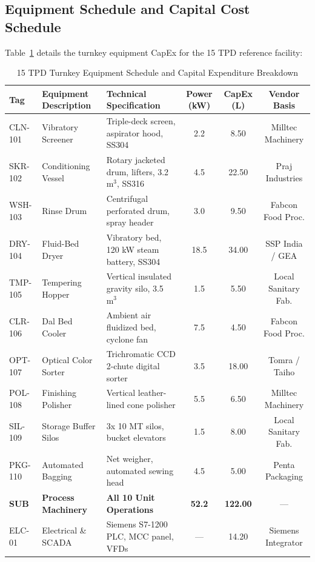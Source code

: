 \documentclass[10pt,a4paper]{article}
\newcommand{\inr}{\text{INR~}}
\begin{document}
\subsection{Equipment Schedule and Capital Cost Schedule}
Table~\ref{tab:equipment_schedule} details the turnkey equipment CapEx for the 15 TPD reference facility:

\begin{table}[H]
\centering
\small
\caption{15 TPD Turnkey Equipment Schedule and Capital Expenditure Breakdown}
\label{tab:equipment_schedule}
\begin{tabularx}{\linewidth}{lp{3.0cm}Xccc}
\toprule
\textbf{Tag} & \textbf{Equipment Description} & \textbf{Technical Specification} & \textbf{Power (kW)} & \textbf{CapEx (\inr L)} & \textbf{Vendor Basis} \\
\midrule
CLN-101 & Vibratory Screener & Triple-deck screen, aspirator hood, SS304 & 2.2 & 8.50 & Milltec Machinery \\
SKR-102 & Conditioning Vessel & Rotary jacketed drum, lifters, 3.2 $\text{m}^3$, SS316 & 4.5 & 22.50 & Praj Industries \\
WSH-103 & Rinse Drum & Centrifugal perforated drum, spray header & 3.0 & 9.50 & Fabcon Food Proc. \\
DRY-104 & Fluid-Bed Dryer & Vibratory bed, 120 kW steam battery, SS304 & 18.5 & 34.00 & SSP India / GEA \\
TMP-105 & Tempering Hopper & Vertical insulated gravity silo, 3.5 $\text{m}^3$ & 1.5 & 5.50 & Local Sanitary Fab. \\
CLR-106 & Dal Bed Cooler & Ambient air fluidized bed, cyclone fan & 7.5 & 4.50 & Fabcon Food Proc. \\
OPT-107 & Optical Color Sorter & Trichromatic CCD 2-chute digital sorter & 3.5 & 18.00 & Tomra / Taiho \\
POL-108 & Finishing Polisher & Vertical leather-lined cone polisher & 5.5 & 6.50 & Milltec Machinery \\
SIL-109 & Storage Buffer Silos & 3x 10 MT silos, bucket elevators & 1.5 & 8.00 & Local Sanitary Fab. \\
PKG-110 & Automated Bagging & Net weigher, automated sewing head & 4.5 & 5.00 & Penta Packaging \\
\midrule
\textbf{SUB} & \textbf{Process Machinery} & \textbf{All 10 Unit Operations} & \textbf{52.2} & \textbf{122.00} & --- \\
ELC-01 & Electrical \& SCADA & Siemens S7-1200 PLC, MCC panel, VFDs & --- & 14.20 & Siemens Integrator \\

\end{tabularx}
\end{table}
\end{document}
